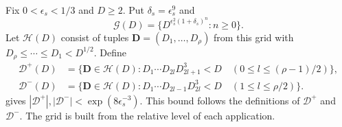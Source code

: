 Fix $0<\epsilon_s<1/3$ and $D\geq2$. Put $\delta_s=\epsilon_s^9$ and
\[
 \mathcal G(D)=\{D^{\epsilon_s^2(1+\delta_s)^n}:n\geq0\}.
\tag{2.28}\label{p1:eq:2.28}
\]
Let $\mathcal H(D)$ consist of tuples $\mathbf D=(D_1,\ldots,D_\rho)$ from this grid with $D_\rho\leq\cdots\leq D_1<D^{1/2}$. Define
\[
\begin{split}
 \mathcal D^+(D)&=\{\mathbf D\in\mathcal H(D):
 D_1\cdots D_{2l}D_{2l+1}^3<D
 \quad(0\leq l\leq(\rho-1)/2)\},\\
 \mathcal D^-(D)&=\{\mathbf D\in\mathcal H(D):
 D_1\cdots D_{2l-1}D_{2l}^3<D
 \quad(1\leq l\leq\rho/2)\}.
\end{split}
\tag{2.29}\label{p1:eq:2.29}
\]
\cite[Theorem~4]{AA37} gives $|\mathcal D^+|,|\mathcal D^-|<\exp(8\epsilon_s^{-3})$. This bound follows the definitions of $\mathcal D^+$ and $\mathcal D^-$. The grid is built from the relative level of each application.

